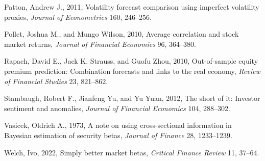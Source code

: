 \documentclass[10pt,twocolumn,letterpaper]{article}
\begin{document}
\begin{list}{}{\setlength{\leftmargin}{1.3em}\setlength{\itemindent}{-1.3em}\setlength{\itemsep}{1.0pt}\setlength{\parsep}{0pt}}
\item Patton, Andrew J., 2011, Volatility forecast comparison using imperfect volatility proxies, \textit{Journal of Econometrics} 160, 246--256.
\item Pollet, Joshua M., and Mungo Wilson, 2010, Average correlation and stock market returns, \textit{Journal of Financial Economics} 96, 364--380.
\item Rapach, David E., Jack K. Strauss, and Guofu Zhou, 2010, Out-of-sample equity premium prediction: Combination forecasts and links to the real economy, \textit{Review of Financial Studies} 23, 821--862.
\item Stambaugh, Robert F., Jianfeng Yu, and Yu Yuan, 2012, The short of it: Investor sentiment and anomalies, \textit{Journal of Financial Economics} 104, 288--302.
\item Vasicek, Oldrich A., 1973, A note on using cross-sectional information in Bayesian estimation of security betas, \textit{Journal of Finance} 28, 1233--1239.
\item Welch, Ivo, 2022, Simply better market betas, \textit{Critical Finance Review} 11, 37--64.
\end{list}
\end{document}
